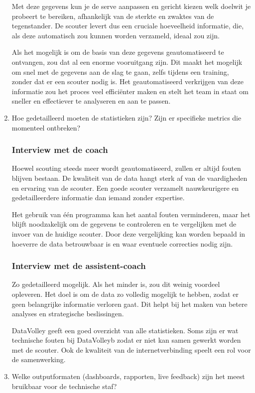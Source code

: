 \begin{enumerate}
  Met deze gegevens kun je de serve aanpassen en gericht kiezen welk doelwit je probeert te bereiken, afhankelijk van de sterkte en zwaktes van de tegenstander. De scouter levert dus een cruciale hoeveelheid informatie, die, als deze automatisch zou kunnen worden verzameld, ideaal zou zijn.

  Als het mogelijk is om de basis van deze gegevens geautomatiseerd te ontvangen, zou dat al een enorme vooruitgang zijn. Dit maakt het mogelijk om snel met de gegevens aan de slag te gaan, zelfs tijdens een training, zonder dat er een scouter nodig is. Het geautomatiseerd verkrijgen van deze informatie zou het proces veel efficiënter maken en stelt het team in staat om sneller en effectiever te analyseren en aan te passen.
  \item Hoe gedetailleerd moeten de statistieken zijn? Zijn er specifieke metrics die momenteel ontbreken?
  \subsubsection{Interview met de coach}
  Hoewel scouting steeds meer wordt geautomatiseerd, zullen er altijd fouten blijven bestaan. De kwaliteit van de data hangt sterk af van de vaardigheden en ervaring van de scouter. Een goede scouter verzamelt nauwkeurigere en gedetailleerdere informatie dan iemand zonder expertise.

  Het gebruik van één programma kan het aantal fouten verminderen, maar het blijft noodzakelijk om de gegevens te controleren en te vergelijken met de invoer van de huidige scouter. Door deze vergelijking kan worden bepaald in hoeverre de data betrouwbaar is en waar eventuele correcties nodig zijn.
  \subsubsection{Interview met de assistent-coach}
  Zo gedetailleerd mogelijk. Als het minder is, zou dit weinig voordeel opleveren. Het doel is om de data zo volledig mogelijk te hebben, zodat er geen belangrijke informatie verloren gaat. Dit helpt bij het maken van betere analyses en strategische beslissingen.

  DataVolley geeft een goed overzicht van alle statistieken. Soms zijn er wat technische fouten bij DataVolleyb zodat er niet kan samen gewerkt worden met de scouter. Ook de kwaliteit van de internetverbinding speelt een rol voor de samenwerking.
  \item Welke outputformaten (dashboards, rapporten, live feedback) zijn het meest bruikbaar voor de technische staf?

\end{enumerate}
